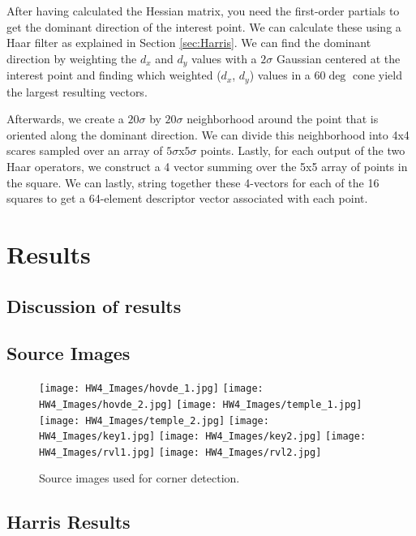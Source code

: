 \documentclass{article}
\begin{document}
After having calculated the Hessian matrix, you need the first-order partials to get the dominant direction of the interest point. We can calculate these using a Haar filter as explained in Section \ref{sec:Harris}. We can find the dominant direction by weighting the $d_x$ and $d_y$ values with a $2\sigma$ Gaussian centered at the interest point and finding which weighted ($d_x$, $d_y$) values in a $60\deg$ cone yield the largest resulting vectors.

Afterwards, we create a $20\sigma$ by $20\sigma$ neighborhood around the point that is oriented along the dominant direction. We can divide this neighborhood into 4x4 scares sampled over an array of $5\sigma$x$5\sigma$ points. Lastly, for each output of the two Haar operators, we construct a 4 vector summing over the 5x5 array of points in the square. We can lastly, string together these 4-vectors for each of the 16 squares to get a 64-element descriptor vector associated with each point.
\section{Results}
\subsection{Discussion of results}
\subsection{Source Images}

\begin{figure}[H]
    \centering
    \texttt{[image: HW4\_Images/hovde\_1.jpg]}
    \texttt{[image: HW4\_Images/hovde\_2.jpg]}
    \texttt{[image: HW4\_Images/temple\_1.jpg]}
    \texttt{[image: HW4\_Images/temple\_2.jpg]}
    \texttt{[image: HW4\_Images/key1.jpg]}
    \texttt{[image: HW4\_Images/key2.jpg]}
    \texttt{[image: HW4\_Images/rvl1.jpg]}
    \texttt{[image: HW4\_Images/rvl2.jpg]}
    \caption{Source images used for corner detection.}
    \label{fig:source_img}
\end{figure}

\subsection{Harris Results}
\end{document}
